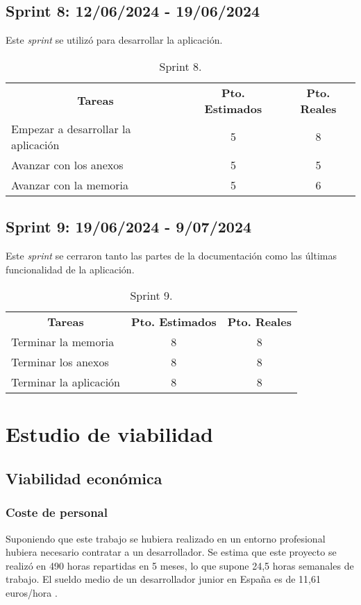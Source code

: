 \subsection{Sprint 8: 12/06/2024 - 19/06/2024 }
Este \textit{sprint} se utilizó para desarrollar la aplicación.
\begin{table}[h]
	\centering
	\begin{tabular}{lcc}
		\multicolumn{1}{c}{\textbf{Tareas}} & \textbf{Pto. Estimados} & \textbf{Pto. Reales}\\
		Empezar a desarrollar la aplicación & 5 & 8 \\
		Avanzar con los anexos & 5 & 5 \\
		Avanzar con la memoria & 5 &6 \\
	\end{tabular}
	\caption{Sprint 8.}
	\label{sprint8}
\end{table}

\subsection{Sprint 9: 19/06/2024 - 9/07/2024 }
Este \textit{sprint} se cerraron tanto las partes de la documentación como las últimas funcionalidad de la aplicación.
\begin{table}[h]
	\centering
	\begin{tabular}{lcc}
		\multicolumn{1}{c}{\textbf{Tareas}} & \textbf{Pto. Estimados} & \textbf{Pto. Reales}\\
		Terminar la memoria & 8 & 8 \\
		Terminar los anexos & 8 & 8 \\
		Terminar la aplicación & 8 &8 \\
	\end{tabular}
	\caption{Sprint 9.}
	\label{sprint9}
\end{table}

\section{Estudio de viabilidad}

\subsection{Viabilidad económica}

\subsubsection{Coste de personal}
Suponiendo que este trabajo se hubiera realizado en un entorno profesional hubiera necesario contratar a un desarrollador. Se estima que este proyecto se realizó en 490 horas repartidas en 5 meses, lo que supone 24,5 horas semanales  de trabajo. El sueldo medio de un desarrollador junior en España es de 11,61 euros/hora \cite{salariomedio}.

